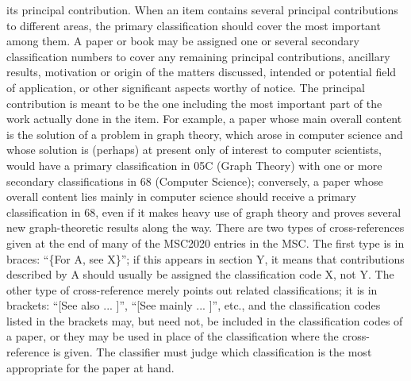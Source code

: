 \documentclass[letterpaper]{article}
\begin{document}
\begin{doublespace}
its   principal contribution.  When  an  item  contains  several  principal  contributions  to  
different
areas, the primary classification should cover the most important among them. A
paper or book may be assigned one or several secondary classification numbers to
cover any remaining principal contributions, ancillary results, motivation or 
origin of
the matters discussed, intended or potential field of application, or other 
significant
aspects worthy of notice.
The principal contribution is meant to be the one including the most important
part of the work actually done in the item. For example, a paper whose main 
overall
content  is  the  solution  of  a  problem  in  graph  theory,  which  arose  in 
 computer
science  and  whose  solution  is  (perhaps)  at  present  only  of  interest  
to  computer
scientists,  would  have  a  primary  classification  in  05C  (Graph  Theory)  
with  one
or  more  secondary  classifications  in  68  (Computer  Science);  conversely,  
a  paper
whose  overall  content  lies  mainly  in  computer  science  should  receive  a 
 primary
classification in 68, even if it makes heavy use of graph theory and proves 
several
new graph-theoretic results along the way.
There are two types of cross-references given at the end of many of the MSC2020 entries
in the MSC. The first type is in braces: “\{For A, see X\}”; if this appears in section
Y,  it  means  that  contributions  described  by  A  should  usually  be  
assigned  the
classification  code  X,  not  Y.  The  other  type  of  cross-reference  
merely 
 points  out
related  classifications;  it  is  in  brackets:  “[See  also
...
]”,  “[See  mainly
...
]”,  etc.,
and the classification codes listed in the brackets may, but need not, be 
included in
the classification codes of a paper, or they may be used in place of the 
classification
where the cross-reference is given. The classifier must judge which 
classification is
the most appropriate for the paper at hand.
\end{doublespace}
\newpage
\end{document}

